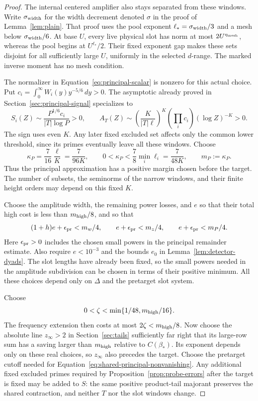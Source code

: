 \begin{proof}
The internal centered amplifier also stays separated from these windows.
Write \(\sigma_{\rm width}\) for the width decrement denoted \(\sigma\)
in the proof of Lemma~\ref{lem:plain}.  That proof uses the pool exponent
\(\ell_*=\sigma_{\rm width}/3\) and a mesh below
\(\sigma_{\rm width}/6\).  At base \(U\), every live physical slot has
norm at most \(2U^{\eta_{\rm mesh}}\), whereas the pool begins at
\(U^{\ell_*}/2\).  Their fixed exponent gap makes these sets disjoint
for all sufficiently large \(U\), uniformly in the selected \(d\)-range.
The marked inverse moment has no mesh condition.

The normalizer in Equation~\eqref{eq:principal-scalar} is nonzero for
this actual choice.  Put
\(c_i=\int_0^\infty W_i(y)y^{-5/6}\,dy>0\).  The asymptotic already
proved in Section~\ref{sec:principal-signal} specializes to
\[
 S_i(Z)\sim\frac{P^{1/6}c_i}{|T|\log P}>0,\qquad
 A_T(Z)\sim
 \left(\frac{K}{|T|\ell}\right)^K
       \left(\prod_i c_i\right)(\log Z)^{-K}>0.
\]
The sign uses even \(K\).  Any later fixed excluded set affects only
the common lower threshold, since its primes eventually leave all
these windows.  Choose
\[
 \kappa_P=\frac7{16}\frac{\ell}{K}=\frac7{96K},
 \qquad 0<\kappa_P<\frac78\min_i\ell_i=\frac7{48K},
 \qquad m_P:=\kappa_P.
\]
Thus the principal approximation has a positive margin chosen before
the target.  The number of subsets, the seminorms of the narrow windows,
and their finite height orders may depend on this fixed \(K\).

Choose the amplitude width, the remaining power losses, and \(e\) so
that their total high cost is less than \(m_{\rm high}/8\), and so that
\[
 (1+h)e+\epsilon_{\rm pr}<m_w/4,\qquad
 e+\epsilon_{\rm pr}<m_z/4,\qquad
 e+\epsilon_{\rm pr}<m_P/4.
\]
Here \(\epsilon_{\rm pr}>0\) includes the chosen small powers in the
principal remainder estimate.  Also require \(e<10^{-3}\) and the bounds
\(e_0\) in Lemma~\ref{lem:detector-dyads}.  The slot lengths have already
been fixed, so the small powers needed in the amplitude subdivision can
be chosen in terms of their positive minimum.  All these choices depend
only on \(\Delta\) and the pretarget slot system.

Choose
\[
 0<\zeta<\min\{1/48,m_{\rm high}/16\}.
\]
The frequency extension then costs at most
\(2\zeta<m_{\rm high}/8\).  Now choose the absolute line \(z_\infty>2\)
in Section~\ref{sec:tails} sufficiently far right that its large-row
sum has a saving larger than \(m_{\rm high}\) relative to \(C(\beta_*)\).
Its exponent depends only on
these real choices, so \(z_\infty\) also precedes the target.
Choose the pretarget cutoff needed for
Equation~\eqref{eq:shared-principal-nonvanishing}.  Any additional fixed
excluded primes required by Proposition~\ref{prop:probe-errors} after
the target is fixed may be added to \(S\): the same positive product-tail
majorant preserves the shared contraction, and neither \(T\) nor the
slot windows change.


\end{proof}
